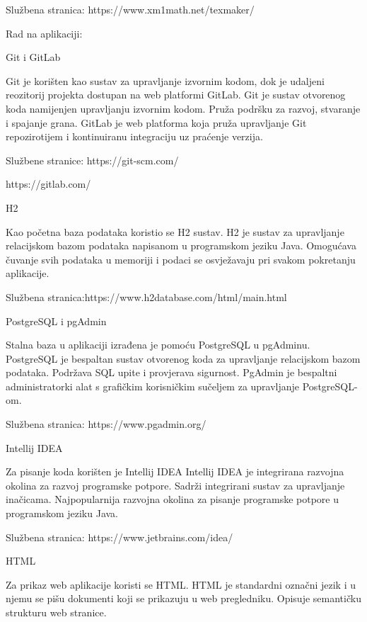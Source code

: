 Službena stranica: https://www.xm1math.net/texmaker/
\vspace{8mm}

Rad na aplikaciji:
\vspace{4mm}

Git i GitLab

Git je korišten kao sustav za upravljanje izvornim kodom, dok je udaljeni reozitorij projekta dostupan na web platformi GitLab.
Git je sustav otvorenog koda namijenjen upravljanju izvornim kodom. Pruža podršku za razvoj, stvaranje i spajanje grana.
GitLab je web platforma koja pruža upravljanje Git repozirotijem i kontinuiranu integraciju uz praćenje verzija. 

Službene stranice: https://git-scm.com/

	https://gitlab.com/
\vspace{3mm}

H2

Kao početna baza podataka koristio se H2 sustav.
H2 je sustav za upravljanje relacijskom bazom podataka napisanom u programskom jeziku Java. Omogućava čuvanje svih podataka u memoriji i podaci se osvježavaju pri svakom pokretanju aplikacije.

Službena stranica:https://www.h2database.com/html/main.html 
\vspace{3mm}

PostgreSQL i pgAdmin

Stalna baza u aplikaciji izrađena je pomoću PostgreSQL u pgAdminu.
PostgreSQL je bespaltan sustav otvorenog koda za upravljanje relacijskom bazom podataka. Podržava SQL upite i provjerava sigurnost.
PgAdmin je bespaltni administratorki alat s grafičkim korisničkim sučeljem za upravljanje PostgreSQL-om.

Službena stranica: https://www.pgadmin.org/
\vspace{3mm}

Intellij IDEA

Za pisanje koda korišten je Intellij IDEA
Intellij IDEA je integrirana razvojna okolina za razvoj programske potpore. Sadrži integrirani sustav za upravljanje inačicama. Najpopularnija razvojna okolina za pisanje programske potpore u programskom jeziku Java.

Službena stranica: https://www.jetbrains.com/idea/
\vspace{3mm}

HTML

Za prikaz web aplikacije koristi se HTML. 
HTML je standardni označni jezik i u njemu se pišu dokumenti koji se prikazuju u web pregledniku. Opisuje semantičku strukturu web stranice.
\vspace{3mm}

